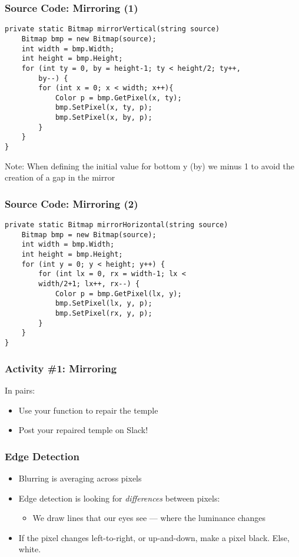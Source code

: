 
\begin{frame}[fragile]
	\frametitle{Source Code: Mirroring (1)}
	
\begin{lstlisting}
private static Bitmap mirrorVertical(string source) 	
	Bitmap bmp = new Bitmap(source);
	int width = bmp.Width;
	int height = bmp.Height;		
	for (int ty = 0, by = height-1; ty < height/2; ty++, 
		by--) {
		for (int x = 0; x < width; x++){
			Color p = bmp.GetPixel(x, ty);
			bmp.SetPixel(x, ty, p);
			bmp.SetPixel(x, by, p);
		}
	}
}
\end{lstlisting}
Note: When defining the initial value for bottom y (by) we minus 1 to avoid the creation of a gap in the mirror

\end{frame}

\begin{frame}[fragile]
	\frametitle{Source Code: Mirroring (2)}
	
\begin{lstlisting}
private static Bitmap mirrorHorizontal(string source) 	
	Bitmap bmp = new Bitmap(source);
	int width = bmp.Width;
	int height = bmp.Height;		
	for (int y = 0; y < height; y++) {
		for (int lx = 0, rx = width-1; lx <
		width/2+1; lx++, rx--) {
			Color p = bmp.GetPixel(lx, y);
			bmp.SetPixel(lx, y, p);
			bmp.SetPixel(rx, y, p);
		}
	}
}
\end{lstlisting}

\end{frame}

\begin{frame}
	\frametitle{Activity \#1: Mirroring}
	
	In pairs:
	
	\vspace{2em}
	
	\begin{itemize}		
		\item Use your function to repair the temple
		\item Post your repaired temple on Slack!
	\end{itemize}
\end{frame}


\begin{frame}
	\frametitle{Edge Detection}
	
	\begin{itemize}		
		\item Blurring is averaging across pixels
		\item Edge detection is looking for \textit{differences} between pixels:
		\begin{itemize}
			\item We draw lines that our eyes see --- where the luminance changes
		\end{itemize}	
		\item If the pixel changes left-to-right, or up-and-down, make a pixel black. Else, white.
	\end{itemize}
\end{frame}

